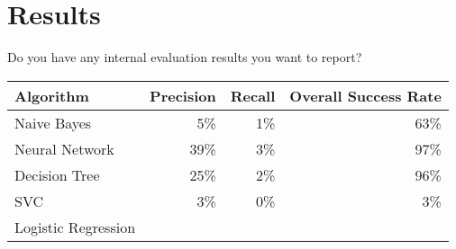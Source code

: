\documentclass[11pt,a4paper]{article}
\begin{document}
\section{Results}
	Do you have any internal evaluation results you want to report?

	\begin{tabular}{ | l | r | r | r | }
		\hline
		Algorithm & Precision & Recall & Overall Success Rate \\
		\hline
		Naive Bayes & 5\% & 1\% & 63\% \\
		\hline
		Neural Network & 39\% & 3\% & 97\% \\
		\hline
		Decision Tree & 25\% & 2\% & 96\% \\
		\hline
		SVC & 3\% & 0\% & 3\% \\
		\hline
		Logistic Regression & & & \\
		\hline
	\end{tabular}
\end{document}
